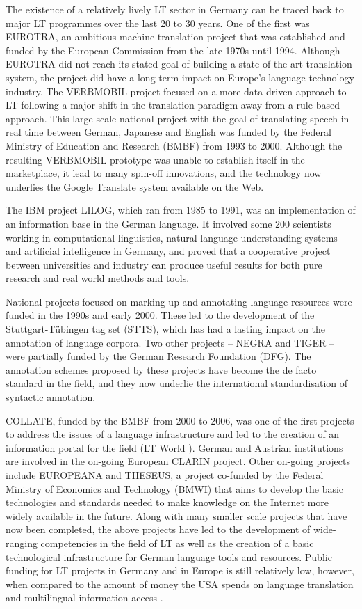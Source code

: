 \documentclass[]{../../metanetpaper}
\begin{document}
\begin{multicols}{2}
The existence of a relatively lively LT sector in Germany can be traced back to major LT programmes over the last 20 to 30 years. One of the first was EUROTRA, an ambitious machine translation project that was established and funded by the European Commission from the late 1970s until 1994. Although EUROTRA did not  reach its stated goal of building a state-of-the-art translation system, the project did have a long-term impact on Europe’s language technology industry. The VERBMOBIL project focused on a more data-driven approach to LT following a major shift in the translation paradigm away from a rule-based approach. This large-scale national project with the goal of translating speech in real time between German, Japanese and English was funded by the Federal Ministry of Education and Research (BMBF) from 1993 to 2000. Although the resulting VERBMOBIL prototype was unable to establish itself in the marketplace, it lead to many spin-off innovations, and the technology now underlies the Google Translate system available on the Web. 

    The IBM project LILOG, which ran from 1985 to 1991, was an implementation of an information base in the German language. It involved some 200 scientists working in computational linguistics, natural language understanding systems and artificial intelligence in Germany, and proved that a cooperative project between universities and industry can produce useful results for both pure research and real world methods and tools.

    National projects focused on marking-up and annotating language resources were funded in the 1990s and early 2000. These led to the development of the Stuttgart-Tübingen tag set (STTS), which has had a lasting impact on the annotation of language corpora. Two other projects -- NEGRA and TIGER -- were partially funded by the German Research Foundation (DFG). The annotation schemes proposed by these projects have become the de facto standard in the field, and they now underlie the international standardisation of syntactic annotation.

    COLLATE, funded by the BMBF from 2000 to 2006, was one of the first projects to address the issues of a language infrastructure and led to the creation of an information portal for the field (LT World \cite{lt-world1}). German and Austrian institutions are involved in the on-going European CLARIN project. Other on-going projects include EUROPEANA and THESEUS, a project co-funded by the Federal Ministry of Economics and Technology (BMWI) that aims to develop the basic technologies and standards needed to make knowledge on the Internet more widely available in the future.
    Along with many smaller scale projects that have now been completed, the above projects have led to the development of wide-ranging competencies in the field of LT as well as the creation of a basic technological infrastructure for German language tools and resources. Public funding for LT projects in Germany and in Europe is still relatively low, however, when compared to the amount of money the USA spends on language translation and multilingual information access \cite{laz1}.


\end{multicols}
\end{document}
